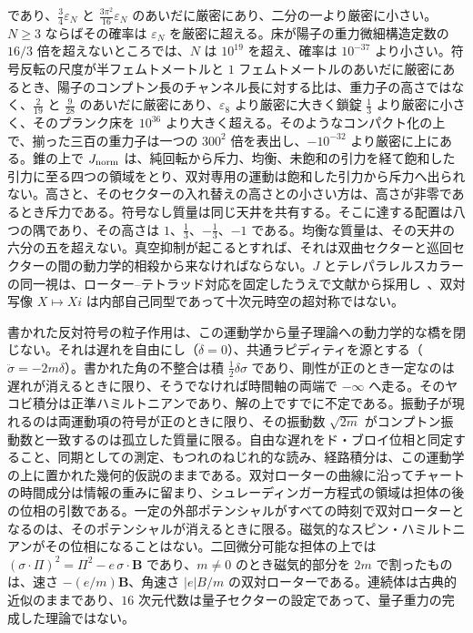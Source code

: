 \documentclass[a4paper]{article}
\begin{document}
であり、\(\tfrac34\varepsilon_N\) と \(\tfrac{3\pi^2}{16}\varepsilon_N\) のあいだに厳密にあり、二分の一より厳密に小さい。\(N\ge 3\) ならばその確率は \(\varepsilon_N\) を厳密に超える。床が陽子の重力微細構造定数の \(16/3\) 倍を超えないところでは、\(N\) は \(10^{19}\) を超え、確率は \(10^{-37}\) より小さい。符号反転の尺度が半フェムトメートルと $1$ フェムトメートルのあいだに厳密にあるとき、陽子のコンプトン長のチャンネル長に対する比は、重力子の高さではなく、\(\tfrac{2}{19}\) と \(\tfrac{9}{28}\) のあいだに厳密にあり、\(\varepsilon_8\) より厳密に大きく鎖錠 \(\tfrac13\) より厳密に小さく、そのプランク床を \(10^{36}\) より大きく超える。そのようなコンパクト化の上で、揃った三百の重力子は一つの \(300^2\) 倍を表出し、\(-10^{-32}\) より厳密に上にある。錐の上で \(J_{\rm norm}\) は、純回転から斥力、均衡、未飽和の引力を経て飽和した引力に至る四つの領域をとり、双対専用の運動は飽和した引力から斥力へ出られない。高さと、そのセクターの入れ替えの高さとの小さい方は、高さが非零であるとき斥力である。符号なし質量は同じ天井を共有する。そこに達する配置は八つの隅であり、その高さは \(1\)、\(\frac13\)、\(-\frac13\)、\(-1\) である。均衡な質量は、その天井の六分の五を超えない。真空抑制が起こるとすれば、それは双曲セクターと巡回セクターの間の動力学的相殺から来なければならない。$J$ とテレパラレルスカラーの同一視は、ローター–テトラッド対応を固定したうえで文献から採用し~\cite{maluf2013}、双対写像 $X\mapsto Xi$ は内部自己同型であって十次元時空の超対称ではない。

書かれた反対符号の粒子作用は、この運動学から量子理論への動力学的な橋を閉じない。それは遅れを自由にし（$\ddot\delta=0$）、共通ラピディティを源とする（$\ddot\sigma=-2m\delta$）。書かれた角の不整合は積 $\tfrac12\delta\sigma$ であり、剛性が正のとき一定なのは遅れが消えるときに限り、そうでなければ時間軸の両端で $-\infty$ へ走る。そのヤコビ積分は正準ハミルトニアンであり、解の上ですでに不定である。振動子が現れるのは両運動項の符号が正のときに限り、その振動数 $\sqrt{2m}$ がコンプトン振動数と一致するのは孤立した質量に限る。自由な遅れをド・ブロイ位相と同定すること、同期としての測定、もつれのねじれ的な読み、経路積分は、この運動学の上に置かれた幾何的仮説のままである。双対ローターの曲線に沿ってチャートの時間成分は情報の重みに留まり、シュレーディンガー方程式の領域は担体の後の位相の引数である。一定の外部ポテンシャルがすべての時刻で双対ローターとなるのは、そのポテンシャルが消えるときに限る。磁気的なスピン・ハミルトニアンがその位相になることはない。二回微分可能な担体の上では $(\sigma\cdot\Pi)^2=\Pi^2-e\,\sigma\cdot\mathbf B$ であり、$m\neq 0$ のとき磁気的部分を $2m$ で割ったものは、速さ $-(e/m)\mathbf B$、角速さ $|e|B/m$ の双対ローターである。連続体は古典的近似のままであり、$16$ 次元代数は量子セクターの設定であって、量子重力の完成した理論ではない。
\end{document}
